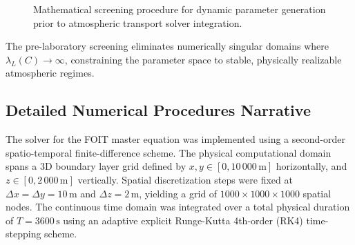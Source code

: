 \documentclass[11pt,a4paper]{article}
\begin{document}
\begin{figure}[H]
\centering
{}
\caption{Mathematical screening procedure for dynamic parameter generation prior to atmospheric transport solver integration.}
\label{fig:screening_flow}
\end{figure}

The pre-laboratory screening eliminates numerically singular domains where $\lambda_L(C) \to \infty$, constraining the parameter space to stable, physically realizable atmospheric regimes.

\subsection{Detailed Numerical Procedures Narrative}

The solver for the FOIT master equation was implemented using a second-order spatio-temporal finite-difference scheme. The physical computational domain spans a 3D boundary layer grid defined by $x, y \in [0, 10\,000\,\text{m}]$ horizontally, and $z \in [0, 2\,000\,\text{m}]$ vertically. Spatial discretization steps were fixed at $\Delta x = \Delta y = 10\,\text{m}$ and $\Delta z = 2\,\text{m}$, yielding a grid of $1000 \times 1000 \times 1000$ spatial nodes. The continuous time domain was integrated over a total physical duration of $T = 3600\,\text{s}$ using an adaptive explicit Runge-Kutta 4th-order (RK4) time-stepping scheme.
\end{document}
